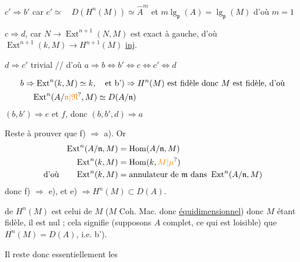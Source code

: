 $c'\Rightarrow b'$ car $c'\simeq\quad D(H^n(M))\simeq\widehat A^{m}$ et $m\lg_{\mathfrak p}(A)=\lg_{\mathfrak p}(M)$ d'où $m=1$


$c\Rightarrow d$, car $N\to\operatorname{Ext}^{n+1}(N,M)$ est exact à gauche, d'où $\operatorname{Ext}^{n+1}(k,M)\to H^{n+1}(M)$ \uline{inj}.

$d\Rightarrow c'$ trivial  // d'où $a\Rightarrow b\Leftrightarrow b'\Leftrightarrow c\Leftrightarrow c'\Leftrightarrow d$

\[
\begin{aligned}
b&\Rightarrow\operatorname{Ext}^n(k,M)\simeq k,\quad
  \text{et b')}\Rightarrow H^n(M)\text{ est fidèle donc }M\text{ est fidèle, d'où}\\
 &\phantom{\Rightarrow}\operatorname{Ext}^n(A/\unsure{\mathfrak n|\mathfrak N},M)\simeq D(A/\mathfrak n)
\end{aligned}
\]
$(b,b')\Rightarrow e$ et $f$, donc $(b,b',d)\Rightarrow a$

Reste à prouver que f) $\Rightarrow$ a).  Or
\[
\begin{aligned}
\operatorname{Ext}^n(A/\mathfrak n,M)&=\operatorname{Hom}(A/\mathfrak n,M)\\
\operatorname{Ext}^n(k,M)&=\operatorname{Hom}(k,\unsure{M|\mu})\\
\text{d'où}\qquad \operatorname{Ext}^n(k,M)&=\text{annulateur de }\mathfrak m\text{ dans }\operatorname{Ext}^n(A/\mathfrak n,M)
\end{aligned}
\]
donc f) $\Rightarrow$ e), et e) $\Rightarrow H^{n}(M)\subset D(A)$.

   de $H^n(M)$ est celui de $M$ ($M$ Coh. Mac. donc \uline{équidimensionnel}) donc $M$ étant fidèle, il est nul ; cela signifie (supposons $A$ complet, ce qui est loisible) que $H^n(M)=D(A)$, i.e. b').

 Il reste donc essentiellement les

